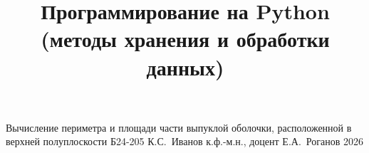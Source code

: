 \documentclass[a4paper,12pt]{memoir}
\begin{document}
\renewcommand{\contentsname}{{\Large{Содержание}\hfill}}

\title{Программирование на Python (методы хранения и обработки данных)}
{Вычисление периметра и площади части выпуклой оболочки, расположенной в верхней полуплоскости}
{Б24-205}
{К.\+С.~Иванов}
{к.ф.-м.н., доцент}
{Е.\+А.~Роганов}
{2026}





\newpage


\end{document}
